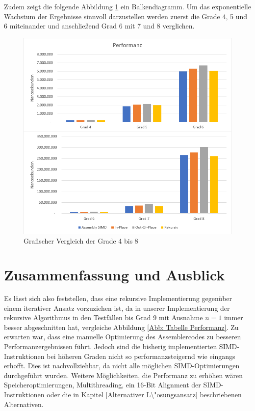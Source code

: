 \documentclass[course=asp]{aspdoc}
\begin{document}
Zudem zeigt die folgende Abbildung \ref{Abb: Diagramm Performanz} ein Balkendiagramm. Um das exponentielle Wachstum der Ergebnisse sinnvoll darzustellen werden zuerst die Grade 4, 5 und 6 miteinander und anschlie\ss end Grad 6 mit 7 und 8 verglichen.

\begin{figure}[ht]
\centering
\includegraphics[scale = 0.65]{diagrammeVertikal.png}
\caption{Grafischer Vergleich der Grade 4 bis 8}\label{Abb: Diagramm Performanz}
\captionsetup[figure]{font=small,labelfont=small}
\end{figure}

\section{Zusammenfassung und Ausblick} \label{Zusammenfassung und Ausblick}
Es l\"asst sich also feststellen, dass eine rekursive Implementierung gegen\"uber einem iterativer Ansatz vorzuziehen ist, da in unserer Implementierung der rekursive Algorithmus in den Testf\"allen bis Grad 9 mit Ausnahme $n = 1$ immer besser abgeschnitten hat, vergleiche Abbildung \ref{Abb: Tabelle Performanz}. Zu erwarten war, dass eine manuelle Optimierung des Assemblercodes zu besseren Performanzergebnissen f\"uhrt. Jedoch sind die bisherig implementierten SIMD-Instruktionen bei h\"oheren Graden nicht so performanzsteigernd wie eingangs erhofft. Dies ist nachvollziehbar, da nicht alle m\"oglichen SIMD-Optimierungen durchgef\"uhrt wurden. Weitere M\"oglichkeiten, die Performanz zu erh\"ohen w\"aren Speicheroptimierungen, Multithreading, ein 16-Bit Alignment der SIMD-Instruktionen oder die in Kapitel \ref{Alternativer L\"osungsansatz} beschriebenen Alternativen.
\end{document}
